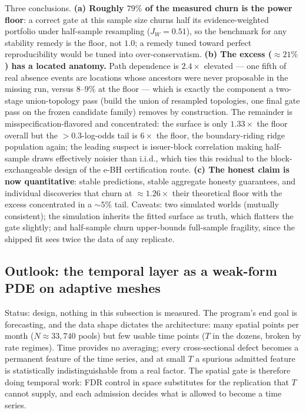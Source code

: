 \documentclass[11pt]{article}
\begin{document}
Three conclusions. \textbf{(a) Roughly $79\%$ of the measured churn is the
power floor}: a correct gate at this sample size churns half its
evidence-weighted portfolio under half-sample resampling ($J_W=0.51$), so the
benchmark for any stability remedy is the floor, not $1.0$; a remedy tuned
toward perfect reproducibility would be tuned into over-conservatism.
\textbf{(b) The excess ($\approx21\%$) has a located anatomy.} Path dependence
is $2.4\times$ elevated --- one fifth of real absence events are locations
whose ancestors were never proposable in the missing run, versus $8$--$9\%$ at
the floor --- which is exactly the component a two-stage union-topology pass
(build the union of resampled topologies, one final gate pass on the frozen
candidate family) removes by construction. The remainder is
misspecification-flavored and concentrated: the surface is only $1.33\times$
the floor overall but the $>0.3$-log-odds tail is $6\times$ the floor, the
boundary-riding ridge population again; the leading suspect is issuer-block
correlation making half-sample draws effectively noisier than i.i.d., which
ties this residual to the block-exchangeable design of the e-BH certification
route. \textbf{(c) The honest claim is now quantitative}: stable predictions,
stable aggregate honesty guarantees, and individual discoveries that churn at
$\approx1.26\times$ their theoretical floor with the excess concentrated in a
$\sim5\%$ tail. Caveats: two simulated worlds (mutually consistent); the
simulation inherits the fitted surface as truth, which flatters the gate
slightly; and half-sample churn upper-bounds full-sample fragility, since the
shipped fit sees twice the data of any replicate.

\subsection{Outlook: the temporal layer as a weak-form PDE on adaptive
meshes}\label{sec:aug5-temporal}

Status: design, nothing in this subsection is measured. The program's end
goal is forecasting, and the data shape dictates the architecture: many
spatial points per month ($N \approx 33{,}740$ pools) but few usable time
points ($T$ in the dozens, broken by rate regimes). Time provides no
averaging; every cross-sectional defect becomes a permanent feature of the
time series, and at small $T$ a spurious admitted feature is statistically
indistinguishable from a real factor. The spatial gate is therefore doing
temporal work: FDR control in space substitutes for the replication that
$T$ cannot supply, and each admission decides what is allowed to become a
time series.
\end{document}
